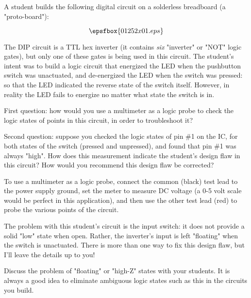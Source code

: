 

A student builds the following digital circuit on a solderless breadboard (a "proto-board"):

$$\epsfbox{01252x01.eps}$$

The DIP circuit is a TTL hex inverter (it contains {\it six} "inverter" or "NOT" logic gates), but only one of these gates is being used in this circuit.  The student's intent was to build a logic circuit that energized the LED when the pushbutton switch was unactuated, and de-energized the LED when the switch was pressed: so that the LED indicated the reverse state of the switch itself.  However, in reality the LED fails to energize no matter what state the switch is in.

\vskip 10pt

First question: how would you use a multimeter as a logic probe to check the logic states of points in this circuit, in order to troubleshoot it?

\vskip 10pt

Second question: suppose you checked the logic states of pin \#1 on the IC, for both states of the switch (pressed and unpressed), and found that pin \#1 was always "high".  How does this measurement indicate the student's design flaw in this circuit?  How would you recommend this design flaw be corrected?







To use a multimeter as a logic probe, connect the common (black) test lead to the power supply ground, set the meter to measure DC voltage (a 0-5 volt scale would be perfect in this application), and then use the other test lead (red) to probe the various points of the circuit.

The problem with this student's circuit is the input switch: it does not provide a solid "low" state when open.  Rather, the inverter's input is left "floating" when the switch is unactuated.  There is more than one way to fix this design flaw, but I'll leave the details up to you!







Discuss the problem of "floating" or "high-Z" states with your students.  It is always a good idea to eliminate ambiguous logic states such as this in the circuits you build.




